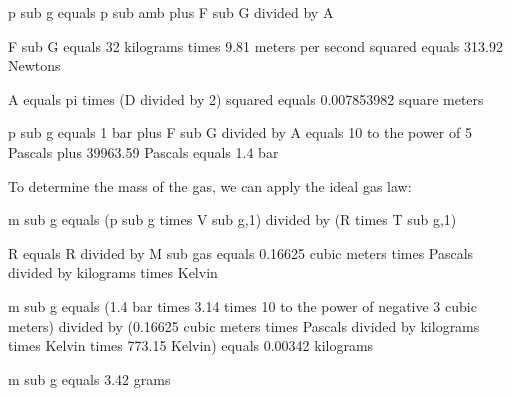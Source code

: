 p sub g equals p sub amb plus F sub G divided by A  

F sub G equals 32 kilograms times 9.81 meters per second squared equals 313.92 Newtons  

A equals pi times (D divided by 2) squared equals 0.007853982 square meters  

p sub g equals 1 bar plus F sub G divided by A equals 10 to the power of 5 Pascals plus 39963.59 Pascals equals 1.4 bar  

To determine the mass of the gas, we can apply the ideal gas law:  

m sub g equals (p sub g times V sub g,1) divided by (R times T sub g,1)  

R equals R divided by M sub gas equals 0.16625 cubic meters times Pascals divided by kilograms times Kelvin  

m sub g equals (1.4 bar times 3.14 times 10 to the power of negative 3 cubic meters) divided by (0.16625 cubic meters times Pascals divided by kilograms times Kelvin times 773.15 Kelvin) equals 0.00342 kilograms  

m sub g equals 3.42 grams